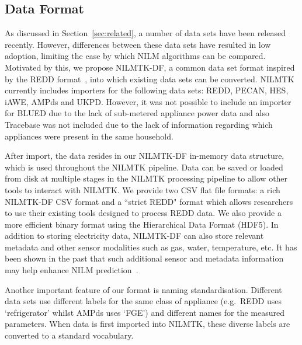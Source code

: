 \documentclass{sig-alternate}
\newcommand{\secref}[1]{Section~\ref{#1}}
\begin{document}


\subsection{Data Format}

\noindent
As discussed in \secref{sec:related}, a number of data sets have been
released recently. However, differences between these data sets have
resulted in low adoption, limiting the ease by which NILM algorithms
can be compared. Motivated by this, we propose NILMTK-DF, a common
data set format inspired by the REDD format~\cite{redd}, into which
existing data sets can be converted. NILMTK currently includes
importers for the following data sets: REDD, PECAN, HES, iAWE, AMPds
and UKPD. However, it was not possible to include an importer for
BLUED due to the lack of sub-metered appliance power data and also
Tracebase was not included due to the lack of information regarding
which appliances were present in the same household.

After import, the data resides in our NILMTK-DF in-memory data structure, which is used throughout the NILMTK pipeline. Data can be saved or loaded from disk at multiple stages in the NILMTK processing pipeline to allow other tools to interact with NILMTK.  We provide two CSV flat file formats: a rich NILMTK-DF CSV format and a ``strict REDD" format which allows researchers to use their existing tools designed to process REDD data.  We also provide a more efficient binary format using the Hierarchical Data Format (HDF5).  In addition to storing electricity data, NILMTK-DF can also store relevant metadata and other sensor modalities such as gas, water, temperature, etc. It has been shown in the past that such additional sensor and metadata information may help enhance NILM prediction~\cite{schoofs_2010}. 

Another important feature of our format is naming standardisation.  Different data sets use different labels for the same class of appliance (e.g.\ REDD uses `refrigerator' whilst AMPds uses `FGE') and different names for the measured parameters.  When data is first imported into NILMTK, these diverse labels are converted to a standard vocabulary.
\end{document}
